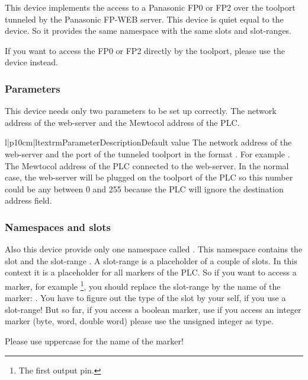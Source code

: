 This device implements the access to a Panasonic FP0 or FP2 over the toolport
tunneled by the Panasonic FP-WEB server. This device is quiet equal to the
 device. So it provides the same namespace with
the same slots and slot-ranges.

If you want to access the FP0 or FP2 directly by the toolport, please use
the  device instead.

\subsubsection{Parameters}
This device needs only two parameters to be set up correctly. The network
address of the web-server and the Mewtocol address of the PLC.
\begin{tableiii}{l|p{10cm}|l}{textrm}{Parameter}{Description}{Default value}
        {The network address of the web-server and the port of the tunneled
        toolport in the format . For example 
        .}
        {}
        {The Mewtocol address of the PLC connected to the web-server. In
        the normal case, the web-server will be plugged on the toolport
        of the PLC so this number could be any between 0 and 255 because
        the PLC will ignore the destination address field.}
        {}
\end{tableiii}

\subsubsection{Namespaces and slots}
Also this device provide only one namespace called . This 
namespace contains the slot  and the slot-range . A
slot-range is a placeholder of a couple of slots. In this context it is a
placeholder for all markers of the PLC. So if you want to access a marker,
for example \footnote{The first output pin.}, you should replace
the slot-range by the name of the marker: . 
You have to figure out the type of the slot by your self, if you use
a slot-range! But so far, if you access a boolean marker, use 
if you access an integer marker (byte, word, double word) please use 
the unsigned integer  as type.
\begin{notice}
Please use uppercase for the name of the marker!
\end{notice}

